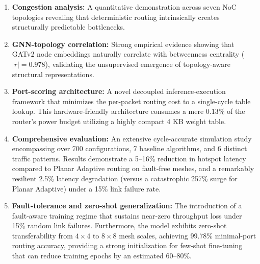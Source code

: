 \begin{enumerate}
    \item \textbf{Congestion analysis:} A quantitative demonstration across seven NoC topologies revealing that deterministic routing intrinsically creates structurally predictable bottlenecks.

    \item \textbf{GNN-topology correlation:} Strong empirical evidence showing that GATv2 node embeddings naturally correlate with betweenness centrality ($|r| = 0.978$), validating the unsupervised emergence of topology-aware structural representations.

    \item \textbf{Port-scoring architecture:} A novel decoupled inference-execution framework that minimizes the per-packet routing cost to a single-cycle table lookup. This hardware-friendly architecture consumes a mere 0.13\% of the router's power budget utilizing a highly compact 4 KB weight table.

    \item \textbf{Comprehensive evaluation:} An extensive cycle-accurate simulation study encompassing over 700 configurations, 7 baseline algorithms, and 6 distinct traffic patterns. Results demonstrate a 5--16\% reduction in hotspot latency compared to Planar Adaptive routing on fault-free meshes, and a remarkably resilient 2.5\% latency degradation (versus a catastrophic 257\% surge for Planar Adaptive) under a 15\% link failure rate.

    \item \textbf{Fault-tolerance and zero-shot generalization:} The introduction of a fault-aware training regime that sustains near-zero throughput loss under 15\% random link failures. Furthermore, the model exhibits zero-shot transferability from $4\times4$ to $8\times8$ mesh scales, achieving 99.78\% minimal-port routing accuracy, providing a strong initialization for few-shot fine-tuning that can reduce training epochs by an estimated 60--80\%.
\end{enumerate}
